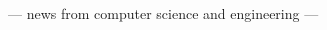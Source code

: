 \documentclass[twoside]{article}
\date{20--22 March 2015}
\begin{document}
\begingroup\maketitle
\centering\par
{\sffamily\fontsize{26pt}{26pt}\selectfont --- news from computer science and engineering ---}
\endgroup\vspace*{-1em}
\begin{multicols}{2}

\end{multicols}
\newpage
\end{document}
